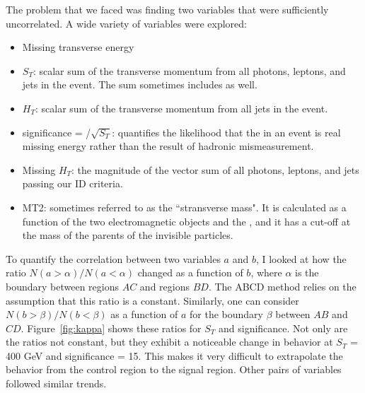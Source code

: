 The problem that we faced was finding two variables that were sufficiently uncorrelated. 
A wide variety of variables were explored:
\begin{itemize}
\item Missing transverse energy \ETmiss
\item $S_T$: scalar sum of the transverse momentum from all photons, leptons, and jets in the event. The sum sometimes includes \ETmiss as well.
\item $H_T$: scalar sum of the transverse momentum from all jets in the event. 
\item \ETmiss significance = \ETmiss/$\sqrt{S_T}$: quantifies the likelihood that the \ETmiss in an event is real missing energy rather than the result of hadronic mismeasurement. 
\item Missing $H_T$: the magnitude of the vector sum of all photons, leptons, and jets passing our ID criteria.
\item MT2: sometimes referred to as the ``stransverse mass". It is calculated as a function of the two electromagnetic objects and the \ETmiss, and it has a cut-off at the mass of the parents of the invisible particles.
\end{itemize}

To quantify the correlation between two variables $a$ and $b$, I looked at how the ratio 
$N(a > \alpha)/N(a < \alpha)$ changed as a function of $b$, where $\alpha$ is the boundary between
regions $AC$ and regions $BD$. The ABCD method relies on the assumption
that this ratio is a constant.
Similarly, one can consider $N(b > \beta)/N(b < \beta)$ as a function 
of $a$ for the boundary $\beta$ between $AB$ and $CD$. Figure~\ref{fig:kappa} shows these ratios 
for $S_T$ and \ETmiss significance. Not only are the ratios not constant,
but they exhibit a noticeable change in behavior at $S_T$ = 400 GeV and \ETmiss 
significance = 15. This makes it very difficult to extrapolate the behavior from the control
region to the signal region. Other pairs of variables followed similar trends. 

